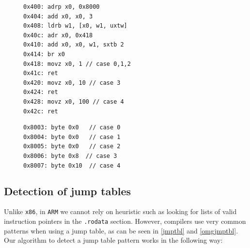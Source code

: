 \documentclass[a4paper,11pt,oneside]{report}
\DeclareRobustCommand{\mat}[1]{{\sethlcolor{red}\hl{MAT: #1}}}
\begin{document}
\begin{figure}[h]
\begin{minipage}{.50\textwidth}
\begin{lstlisting}[basicstyle=\ttfamily\small,numbers=none]
0x400: adrp x0, 0x8000
0x404: add x0, x0, 3
0x408: ldrb w1, [x0, w1, uxtw]
0x40c: adr x0, 0x418
0x410: add x0, x0, w1, sxtb 2
0x414: br x0
0x418: movz x0, 1 // case 0,1,2
0x41c: ret
0x420: movz x0, 10 // case 3
0x424: ret
0x428: movz x0, 100 // case 4
0x42c: ret
\end{lstlisting}
\end{minipage}\hfill
\begin{minipage}{.45\textwidth}
\begin{lstlisting}[basicstyle=\ttfamily\small,numbers=none]
0x8003: byte 0x0   // case 0
0x8004: byte 0x0   // case 1
0x8005: byte 0x0   // case 2
0x8006: byte 0x8  // case 3
0x8007: byte 0x10  // case 4
\end{lstlisting}
\end{minipage}
\label{omgjmptbl}
\end{figure}





\subsection{Detection of jump tables}
Unlike \texttt{x86}, in \texttt{ARM} we cannot rely on heuristic such as looking for 
lists of valid instruction pointers in the \texttt{.rodata} section. 
However, compilers use very common patterns when using a jump table, as can be seen
in \autoref{jmptbl} and \autoref{omgjmptbl}. 
Our algorithm to detect a jump table pattern works in the following way:
\end{document}
